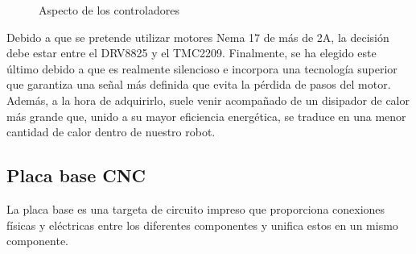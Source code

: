 \begin{figure} [h!]
  \centering    
  \hspace{0.5cm}
  \hspace{0.5cm}
  \hspace{0.5cm}
  \caption[Controladores existentes en el mercado]{Aspecto de los controladores}
  \label{fig:controladores}
\end{figure}

Debido a que se pretende utilizar motores Nema 17 de más de 2A, la decisión debe estar entre el DRV8825 y el TMC2209. Finalmente, se 
ha elegido este último debido a que es realmente silencioso e incorpora una tecnología superior que garantiza una señal más definida que 
evita la pérdida de pasos del motor. Además, a la hora de adquirirlo, suele venir acompañado de un disipador de calor más grande que, unido 
a su mayor eficiencia energética, se traduce en una menor cantidad de calor dentro de nuestro robot. 

\subsection{Placa base CNC}
\noindent La placa base es una targeta de circuito impreso que proporciona conexiones físicas y eléctricas entre los diferentes componentes y 
unifica estos en un mismo componente. 

